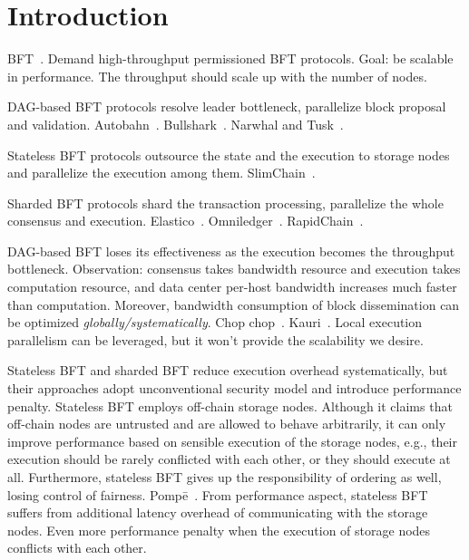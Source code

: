 \section{Introduction}

BFT~\cite{bgp}.
Demand high-throughput permissioned BFT protocols.
Goal: be scalable in performance.
The throughput should scale up with the number of nodes.

DAG-based BFT protocols resolve leader bottleneck, parallelize block proposal and validation.
Autobahn~\cite{autobahn}.
Bullshark~\cite{bullshark}.
Narwhal and Tusk~\cite{narwhal}.

Stateless BFT protocols outsource the state and the execution to storage nodes and parallelize the execution among them.
SlimChain~\cite{slimchain}.

Sharded BFT protocols shard the transaction processing, parallelize the whole consensus and execution.
Elastico~\cite{elastico}.
Omniledger~\cite{omniledger}.
RapidChain~\cite{rapidchain}.

DAG-based BFT loses its effectiveness as the execution becomes the throughput bottleneck.
Observation: consensus takes bandwidth resource and execution takes computation resource, and data center per-host bandwidth increases much faster than computation.
Moreover, bandwidth consumption of block dissemination can be optimized \emph{globally\slash systematically}.
Chop chop~\cite{chop}.
Kauri~\cite{kauri}.
Local execution parallelism can be leveraged, but it won't provide the scalability we desire.

Stateless BFT and sharded BFT reduce execution overhead systematically, but their approaches adopt unconventional security model and introduce performance penalty.
Stateless BFT employs off-chain storage nodes.
Although it claims that off-chain nodes are untrusted and are allowed to behave arbitrarily, it can only improve performance based on sensible execution of the storage nodes, e.g., their execution should be rarely conflicted with each other, or they should execute at all.
Furthermore, stateless BFT gives up the responsibility of ordering as well, losing control of fairness.
Pomp\=e~\cite{pompe}.
From performance aspect, stateless BFT suffers from additional latency overhead of communicating with the storage nodes.
Even more performance penalty when the execution of storage nodes conflicts with each other.

